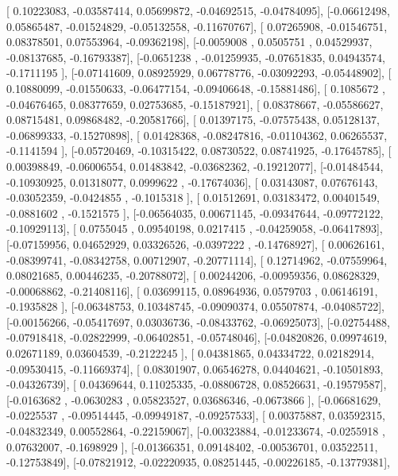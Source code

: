 \documentclass{article}
\begin{document}
       [ 0.10223083, -0.03587414,  0.05699872, -0.04692515, -0.04784095],
       [-0.06612498,  0.05865487, -0.01524829, -0.05132558, -0.11670767],
       [ 0.07265908, -0.01546751,  0.08378501,  0.07553964, -0.09362198],
       [-0.0059008 ,  0.0505751 ,  0.04529937, -0.08137685, -0.16793387],
       [-0.0651238 , -0.01259935, -0.07651835,  0.04943574, -0.1711195 ],
       [-0.07141609,  0.08925929,  0.06778776, -0.03092293, -0.05448902],
       [ 0.10880099, -0.01550633, -0.06477154, -0.09406648, -0.15881486],
       [ 0.1085672 , -0.04676465,  0.08377659,  0.02753685, -0.15187921],
       [ 0.08378667, -0.05586627,  0.08715481,  0.09868482, -0.20581766],
       [ 0.01397175, -0.07575438,  0.05128137, -0.06899333, -0.15270898],
       [ 0.01428368, -0.08247816, -0.01104362,  0.06265537, -0.1141594 ],
       [-0.05720469, -0.10315422,  0.08730522,  0.08741925, -0.17645785],
       [ 0.00398849, -0.06006554,  0.01483842, -0.03682362, -0.19212077],
       [-0.01484544, -0.10930925,  0.01318077,  0.0999622 , -0.17674036],
       [ 0.03143087,  0.07676143, -0.03052359, -0.0424855 , -0.1015318 ],
       [ 0.01512691,  0.03183472,  0.00401549, -0.0881602 , -0.1521575 ],
       [-0.06564035,  0.00671145, -0.09347644, -0.09772122, -0.10929113],
       [ 0.0755045 ,  0.09540198,  0.0217415 , -0.04259058, -0.06417893],
       [-0.07159956,  0.04652929,  0.03326526, -0.0397222 , -0.14768927],
       [ 0.00626161, -0.08399741, -0.08342758,  0.00712907, -0.20771114],
       [ 0.12714962, -0.07559964,  0.08021685,  0.00446235, -0.20788072],
       [ 0.00244206, -0.00959356,  0.08628329, -0.00068862, -0.21408116],
       [ 0.03699115,  0.08964936,  0.0579703 ,  0.06146191, -0.1935828 ],
       [-0.06348753,  0.10348745, -0.09090374,  0.05507874, -0.04085722],
       [-0.00156266, -0.05417697,  0.03036736, -0.08433762, -0.06925073],
       [-0.02754488, -0.07918418, -0.02822999, -0.06402851, -0.05748046],
       [-0.04820826,  0.09974619,  0.02671189,  0.03604539, -0.2122245 ],
       [ 0.04381865,  0.04334722,  0.02182914, -0.09530415, -0.11669374],
       [ 0.08301907,  0.06546278,  0.04404621, -0.10501893, -0.04326739],
       [ 0.04369644,  0.11025335, -0.08806728,  0.08526631, -0.19579587],
       [-0.0163682 , -0.0630283 ,  0.05823527,  0.03686346, -0.0673866 ],
       [-0.06681629, -0.0225537 , -0.09514445, -0.09949187, -0.09257533],
       [ 0.00375887,  0.03592315, -0.04832349,  0.00552864, -0.22159067],
       [-0.00323884, -0.01233674, -0.0255918 ,  0.07632007, -0.1698929 ],
       [-0.01366351,  0.09148402, -0.00536701,  0.03522511, -0.12753849],
       [-0.07821912, -0.02220935,  0.08251445, -0.00226185, -0.13779381],
\end{document}
